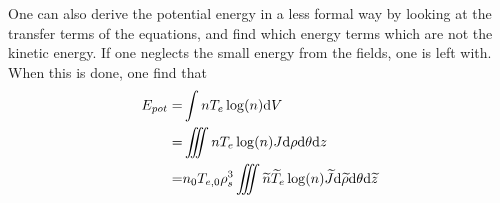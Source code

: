 One can also derive the potential energy in a less formal way by looking at the
transfer terms of the equations, and find which energy terms which are not the
kinetic energy. If one neglects the small energy from the fields, one is left
with. When this is done, one find that
%
\begin{align*}
    E_{pot}
    =& \int nT_e\log(n) \text{d} V
    \\
    =& \iiint nT_e\log(n) J \text{d}\rho \text{d}\theta \text{d} z
    \\
    =& n_0T_{e,0}\rho_s^3\iiint \widetilde{ n}\widetilde{ T}_e\log(n) \widetilde{ J}
    \text{d}\widetilde{ \rho} \text{d}\theta \text{d} \widetilde{ z}
\end{align*}
